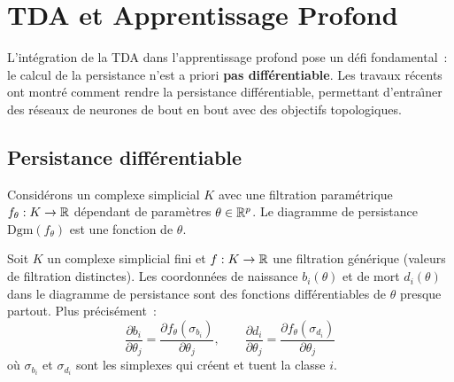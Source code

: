 \chapter{TDA et Apprentissage Profond}
\label{ch:deep_tda}

\begin{intuition}
L'int\'egration de la TDA dans l'apprentissage profond pose un
d\'efi fondamental~: le calcul de la persistance n'est a priori
\textbf{pas diff\'erentiable}. Les travaux r\'ecents ont montr\'e
comment rendre la persistance diff\'erentiable, permettant
d'entra\^\i ner des r\'eseaux de neurones de bout en bout avec
des objectifs topologiques.
\end{intuition}

\section{Persistance diff\'erentiable}
\label{sec:persistance_diff}

\begin{definition}
Consid\'erons un complexe simplicial $K$ avec une filtration
param\'etrique $f_\theta : K \to \mathbb{R}$ d\'ependant de param\`etres
$\theta \in \mathbb{R}^p$. Le diagramme de persistance
$\mathrm{Dgm}(f_\theta)$ est une fonction de $\theta$.
\end{definition}

\begin{theoreme}
\label{thm:diff_persistance}
Soit $K$ un complexe simplicial fini et $f : K \to \mathbb{R}$ une
filtration g\'en\'erique (valeurs de filtration distinctes).
Les coordonn\'ees de naissance $b_i(\theta)$ et de mort
$d_i(\theta)$ dans le diagramme de persistance sont des fonctions
diff\'erentiables de $\theta$ presque partout. Plus pr\'ecis\'ement~:
\[
  \frac{\partial b_i}{\partial \theta_j} =
  \frac{\partial f_\theta(\sigma_{b_i})}{\partial \theta_j}, \qquad
  \frac{\partial d_i}{\partial \theta_j} =
  \frac{\partial f_\theta(\sigma_{d_i})}{\partial \theta_j}
\]
o\`u $\sigma_{b_i}$ et $\sigma_{d_i}$ sont les simplexes qui
cr\'eent et tuent la classe $i$.
\end{theoreme}

